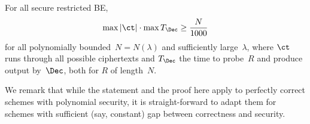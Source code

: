 \begin{theorem}\label{thm:lower-bound}
For all secure restricted BE,
\begin{align*}
\max{|\ct|}\cdot\max{T_\Dec}\geq\frac{N}{1000}
\end{align*}
for all polynomially bounded~${N=N(\lambda)}$ and sufficiently large~$\lambda$,
where $\ct$ runs through all possible ciphertexts and
$T_\Dec$ the time to probe~$R$ and produce output by~$\Dec$,
both for $R$ of length~$N$.
\end{theorem}

\noindent
We remark that while the statement and the proof here apply to perfectly correct schemes with polynomial security, it is straight-forward to adapt them for schemes with sufficient (say, constant) gap between correctness and security.
